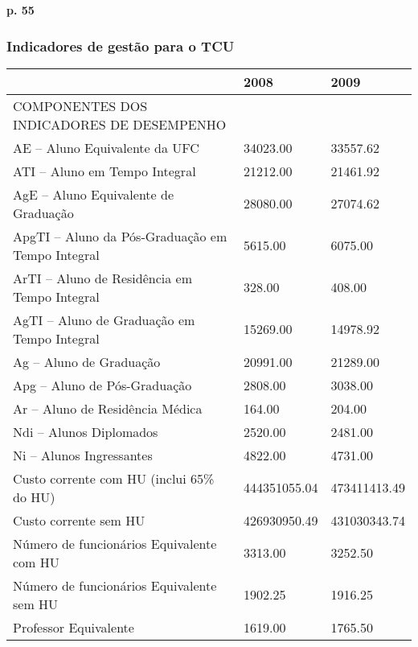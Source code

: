 \documentclass{article}
\begin{document}
\textbf{p. 55}

\subsubsection{Indicadores de gestão para o TCU}
\cite{indicadores_TCU}
\begin{tabular}{lll}
\toprule
{} &          2008 &          2009 \\
\midrule
COMPONENTES DOS INDICADORES DE DESEMPENHO                   &               &               \\
AE – Aluno Equivalente da UFC                             &  34023.00 &  33557.62 \\
ATI – Aluno em Tempo Integral                               &  21212.00 &  21461.92 \\
AgE – Aluno Equivalente de Graduação                        &  28080.00 &  27074.62 \\
ApgTI – Aluno da Pós-Graduação em Tempo Integral            &  5615.00 &  6075.00 \\
ArTI – Aluno de Residência em Tempo Integral                &  328.00 &  408.00 \\
AgTI – Aluno de Graduação em Tempo Integral                 &  15269.00 &  14978.92 \\
Ag – Aluno de Graduação                                     &  20991.00 &  21289.00 \\
Apg – Aluno de Pós-Graduação                                &  2808.00 &  3038.00 \\
Ar – Aluno de Residência Médica                             &  164.00 &  204.00 \\
Ndi – Alunos Diplomados                                     &  2520.00 &  2481.00 \\
Ni – Alunos Ingressantes                                    &  4822.00 &  4731.00 \\
Custo corrente com HU (inclui 65\% do HU)                   &  444351055.04 &  473411413.49 \\
Custo corrente sem HU                                       &  426930950.49 &  431030343.74 \\
Número de funcionários Equivalente com HU                   &  3313.00 &  3252.50 \\
Número de funcionários Equivalente sem HU                   &  1902.25 &  1916.25 \\
Professor Equivalente                                       &  1619.00 &  1765.50 \\

\end{tabular}
\end{document}
